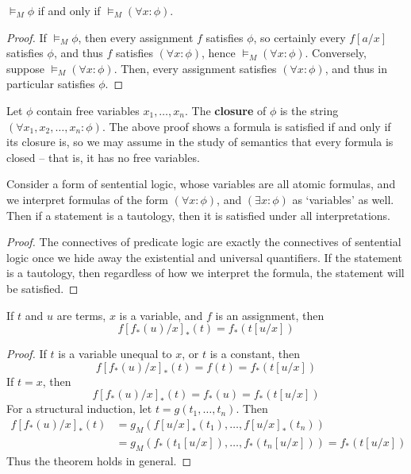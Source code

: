 \begin{lemma}
    $\vDash_M \phi$ if and only if $\vDash_M (\forall x: \phi)$.
\end{lemma}
\begin{proof}
    If $\vDash_M \phi$, then every assignment $f$ satisfies $\phi$, so certainly every $f[a/x]$ satisfies $\phi$, and thus $f$ satisfies $(\forall x: \phi)$, hence $\vDash_M (\forall x: \phi)$. Conversely, suppose $\vDash_M (\forall x: \phi)$. Then, every assignment satisfies $(\forall x: \phi)$, and thus in particular satisfies $\phi$.
\end{proof}

Let $\phi$ contain free variables $x_1, \dots, x_n$. The {\bf closure} of $\phi$ is the string $(\forall x_1, x_2, \dots, x_n: \phi)$. The above proof shows a formula is satisfied if and only if its closure is, so we may assume in the study of semantics that every formula is closed -- that is, it has no free variables.

\begin{theorem}
    Consider a form of sentential logic, whose variables are all atomic formulas, and we interpret formulas of the form $(\forall x: \phi)$, and $(\exists x: \phi)$ as `variables' as well. Then if a statement is a tautology, then it is satisfied under all interpretations.
\end{theorem}
\begin{proof}
    The connectives of predicate logic are exactly the connectives of sentential logic once we hide away the existential and universal quantifiers. If the statement is a tautology, then regardless of how we interpret the formula, the statement will be satisfied.
\end{proof}

\begin{lemma}
    If $t$ and $u$ are terms, $x$ is a variable, and $f$ is an assignment, then
    \[ f[f_*(u)/x]_*(t) = f_*(t[u/x]) \]
\end{lemma}
\begin{proof}
    If $t$ is a variable unequal to $x$, or $t$ is a constant, then
    \[ f[f_*(u)/x]_*(t) = f(t) = f_*(t[u/x]) \]
    If $t = x$, then
    \[ f[f_*(u)/x]_*(t) = f_*(u) = f_*(t[u/x]) \]
    For a structural induction, let $t = g(t_1, \dots, t_n)$. Then
    \begin{align*}
        f[f_*(u)/x]_*(t) &= g_M(f[u/x]_*(t_1), \dots, f[u/x]_*(t_n))\\
        &= g_M(f_*(t_1[u/x]), \dots, f_*(t_n[u/x])) = f_*(t[u/x])
    \end{align*}
    Thus the theorem holds in general.
\end{proof}

